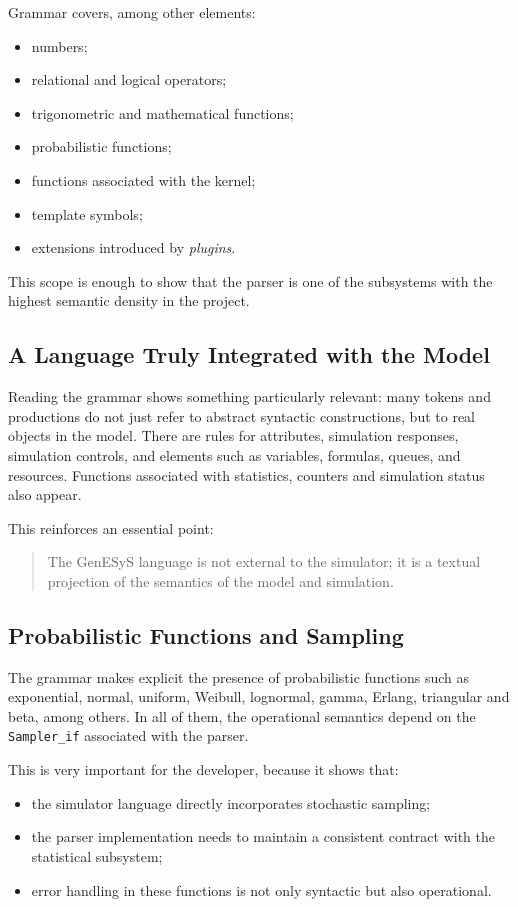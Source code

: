 Grammar covers, among other elements:
\begin{itemize}
 \item numbers;
 \item relational and logical operators;
 \item trigonometric and mathematical functions;
 \item probabilistic functions;
 \item functions associated with the kernel;
 \item template symbols;
 \item extensions introduced by \textit{plugins}.
\end{itemize}

This scope is enough to show that the parser is one of the subsystems with the highest semantic density in the project.

\subsection{A Language Truly Integrated with the Model}
\label{subsec:cap9_linguagem_integrada_modelo}

Reading the grammar shows something particularly relevant: many tokens and productions do not just refer to abstract syntactic constructions, but to real objects in the model. There are rules for attributes, simulation responses, simulation controls, and elements such as variables, formulas, queues, and resources. Functions associated with statistics, counters and simulation status also appear.

This reinforces an essential point:
\begin{quote}
 The GenESyS language is not external to the simulator; it is a textual projection of the semantics of the model and simulation.
\end{quote}

\subsection{Probabilistic Functions and Sampling}
\label{subsec:cap9_funcoes_probabilisticas_amostragem}

The grammar makes explicit the presence of probabilistic functions such as exponential, normal, uniform, Weibull, lognormal, gamma, Erlang, triangular and beta, among others. In all of them, the operational semantics depend on the \texttt{Sampler\_if} associated with the parser.

This is very important for the developer, because it shows that:
\begin{itemize}
 \item the simulator language directly incorporates stochastic sampling;
 \item the parser implementation needs to maintain a consistent contract with the statistical subsystem;
 \item error handling in these functions is not only syntactic but also operational.
\end{itemize}

